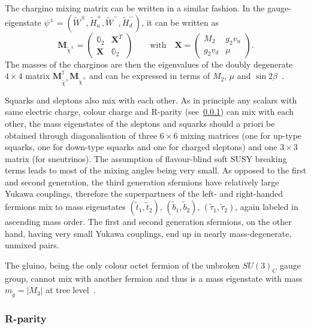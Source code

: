 The chargino mixing matrix can be written in a similar fashion. In the gauge-eigenstate $\psi^\pm = (\tilde{W}^\pm , \tilde{H}^+_u, \tilde{W}^-, \tilde{H}^-_d)$, it can be written as
\begin{equation}
	\boldsymbol{M}_{\tilde{\chi}^\pm} = \begin{pmatrix}
		\mathbb{0}_2 & \boldsymbol{X}^T \\
		\boldsymbol{X} & \mathbb{0}_2
	\end{pmatrix}
	\qquad \textrm{with} \quad \boldsymbol{X} = \begin{pmatrix}
		M_2 & g_2 v_u\\
		g_2 v_d & \mu
	\end{pmatrix}.
\end{equation}
The masses of the charginos are then the eigenvalues of the doubly degenerate $4\times 4$ matrix $\boldsymbol{M}^{\dagger}_{\tilde{\chi}^\pm}\boldsymbol{M}_{\tilde{\chi}^\pm}$ and can be expressed in terms of $M_2$, $\mu$ and $\sin{2\beta}$~\cite{Martin:1997ns}. 

Squarks and sleptons also mix with each other. As in principle any scalars with same electric charge, colour charge and R-parity (see~\cref{sec:rparity}) can mix with each other, the mass eigenstates of the sleptons and squarks should a priori be obtained through diagonalisation of three $6\times 6$ mixing matrices (one for up-type squarks, one for down-type squarks and one for charged sleptons) and one $3\times 3$ matrix (for sneutrinos). The assumption of flavour-blind soft SUSY breaking terms leads to most of the mixing angles being very small. As opposed to the first and second generation, the third generation sfermions have relatively large Yukawa couplings, therefore the superpartners of the left- and right-handed fermions mix to mass eigenstates $(\tilde{t}_1,\tilde{t}_2)$, $(\tilde{b}_1,\tilde{b}_2)$, $(\tilde{\tau}_1,\tilde{\tau}_2)$, again labeled in ascending mass order. The first and second generation sfermions, on the other hand, having very small Yukawa couplings, end up in nearly mass-degenerate, unmixed pairs.

The gluino, being the only colour octet fermion of the unbroken $SU(3)_C$ gauge group, cannot mix with another fermion and thus is a mass eigenstate with mass $m_{\tilde{g}} = \vert M_3 \vert$ at tree level~\cite{Martin:1997ns,baer_tata_2006}.

\subsubsection{R-parity}\label{sec:rparity}


